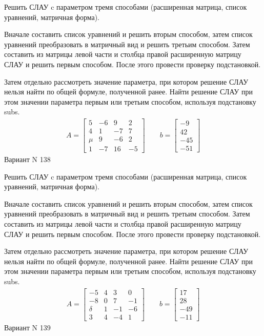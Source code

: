 \documentclass[11pt]{report}
\begin{document}
Решить СЛАУ c параметром тремя способами (расширенная матрица, список уравнений, матричная форма).

Вначале составить список уравнений и решить вторым способом,
затем список уравнений преобразовать в матричный вид и решить третьим способом.
Затем составить из матрицы левой части и столбца правой расширенную матрицу СЛАУ и решить первым способом.
После этого провести проверку подстановкой.

Затем отдельно рассмотреть значение параметра, при котором решение СЛАУ нельзя найти по общей формуле,
полученной ранее.
Найти решение СЛАУ при этом значении параметра первым или третьим способом, используя подстановку subs.
\begin{align*}
    A = \left[\begin{matrix}5 & -6 & 9 & 2\\4 & 1 & -7 & 7\\\mu & 9 & -6 & 2\\1 & -7 & 16 & -5\end{matrix}\right]
\qquad b = \left[\begin{matrix}-9\\42\\-45\\-51\end{matrix}\right]
\end{align*}
\newpage
Вариант N 138


Решить СЛАУ c параметром тремя способами (расширенная матрица, список уравнений, матричная форма).

Вначале составить список уравнений и решить вторым способом,
затем список уравнений преобразовать в матричный вид и решить третьим способом.
Затем составить из матрицы левой части и столбца правой расширенную матрицу СЛАУ и решить первым способом.
После этого провести проверку подстановкой.

Затем отдельно рассмотреть значение параметра, при котором решение СЛАУ нельзя найти по общей формуле,
полученной ранее.
Найти решение СЛАУ при этом значении параметра первым или третьим способом, используя подстановку subs.
\begin{align*}
    A = \left[\begin{matrix}-5 & 4 & 3 & 0\\-8 & 0 & 7 & -1\\\delta & 1 & -1 & -6\\3 & 4 & -4 & 1\end{matrix}\right]
\qquad b = \left[\begin{matrix}17\\28\\-49\\-11\end{matrix}\right]
\end{align*}
\newpage
Вариант N 139
\end{document}
